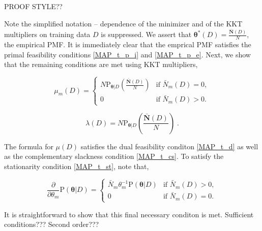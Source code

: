 \documentclass[12pt]{article}
\begin{document}
PROOF STYLE??

Note the simplified notation -- dependence of the minimizer and of the KKT multipliers on training data $D$ is suppressed. We assert that $\bm{\theta}^*(D) = \frac{\bar{\bm{N}}(D)}{N}$, the empirical PMF. It is immediately clear that the emprical PMF satisfies the primal feasibility conditions \eqref{MAP_t_p_i} and \eqref{MAP_t_p_e}. Next, we show that the remaining conditions are met using KKT multipliers,

\begin{equation}
\mu_m(D) = \begin{cases} N \text{P}_{\bm{\theta} | D} \left( \frac{\bar{\bm{N}}(D)}{N} \right) & \text{if } \bar{N}_m(D) = 0, \\ 0 & \text{if } \bar{N}_m(D) > 0. \end{cases}
\end{equation}

\begin{equation}
\lambda(D) =  N \text{P}_{\bm{\theta} | D} \left( \frac{\bar{\bm{N}}(D)}{N} \right) \;.
\end{equation}

The formula for $\mu(D)$ satisfies the dual feasibility conditon \eqref{MAP_t_d} as well as the complementary slackness condition \eqref{MAP_t_cs}. To satisfy the stationarity condition \eqref{MAP_t_st}, note that,

\begin{equation}
\frac{\partial}{\partial \theta_m} \text{P}(\bm{\theta} | D) = \begin{cases} \bar{N}_m \theta_m^{-1} \text{P}(\bm{\theta} | D) & \text{if } \bar{N}_m(D) > 0, \\ 0 & \text{if } \bar{N}_m(D) = 0. \end{cases}
\end{equation}

It is straightforward to show that this final necessary conditon is met. Sufficient conditions??? Second order???

\end{document}
